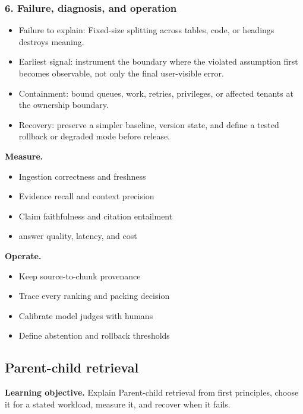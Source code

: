 \subsubsection*{6. Failure, diagnosis, and operation}
\begin{itemize}
\item Failure to explain: Fixed-size splitting across tables, code, or headings destroys meaning.
\item Earliest signal: instrument the boundary where the violated assumption first becomes observable, not only the final user-visible error.
\item Containment: bound queues, work, retries, privileges, or affected tenants at the ownership boundary.
\item Recovery: preserve a simpler baseline, version state, and define a tested rollback or degraded mode before release.
\end{itemize}
\textbf{Measure.}\begin{itemize}
\item Ingestion correctness and freshness
\item Evidence recall and context precision
\item Claim faithfulness and citation entailment
\item answer quality, latency, and cost
\end{itemize}
\textbf{Operate.}\begin{itemize}
\item Keep source-to-chunk provenance
\item Trace every ranking and packing decision
\item Calibrate model judges with humans
\item Define abstention and rollback thresholds
\end{itemize}
\subsection{Parent-child retrieval}
\textbf{Learning objective.} Explain Parent-child retrieval from first principles, choose it for a stated workload, measure it, and recover when it fails.
